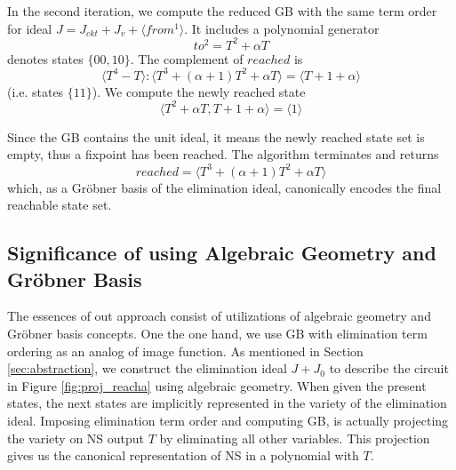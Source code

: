 \begin{Example}
In the second iteration, we compute the reduced GB with the same term
order for ideal $J = J_{ckt}+J_v+\langle from^1\rangle$. 
It includes a polynomial generator $$to^2 = T^2+\alpha T$$ denotes states
$\{00,10\}$. The complement of $reached$ is $$\langle T^4-T\rangle:\langle T^3+(\alpha+1)T^2+\alpha T\rangle
= \langle T + 1+\alpha\rangle$$ (i.e. states $\{11\}$). We compute the newly reached state 
$$\langle T^2+\alpha T, T+1+\alpha \rangle = \langle 1\rangle$$ 

Since the GB contains the unit ideal, it means the newly reached state
set is empty, thus a fixpoint has been reached. The algorithm
terminates and returns $$reached = \langle T^3+(\alpha+1)T^2+\alpha
T\rangle$$ which, as a Gr\"obner basis of the elimination ideal,
canonically encodes the final reachable state set. 
\end{Example}


\subsection{Significance of using Algebraic Geometry and Gr\"obner Basis}
The essences of out approach consist of utilizations of algebraic geometry and Gr\"obner basis concepts.
One the one hand, we use GB with elimination term ordering as an analog of image function.
As mentioned in Section \ref{sec:abstraction}, we construct the elimination ideal $J+J_0$ to 
describe the circuit in Figure \ref{fig:proj_reacha} using algebraic geometry.
When given the present states, the next states are implicitly represented in the variety of 
the elimination ideal. Imposing elimination term order and computing GB, is actually 
projecting the variety on NS output $T$ by eliminating all other variables.
This projection gives us the canonical representation of NS in a polynomial with $T$.

